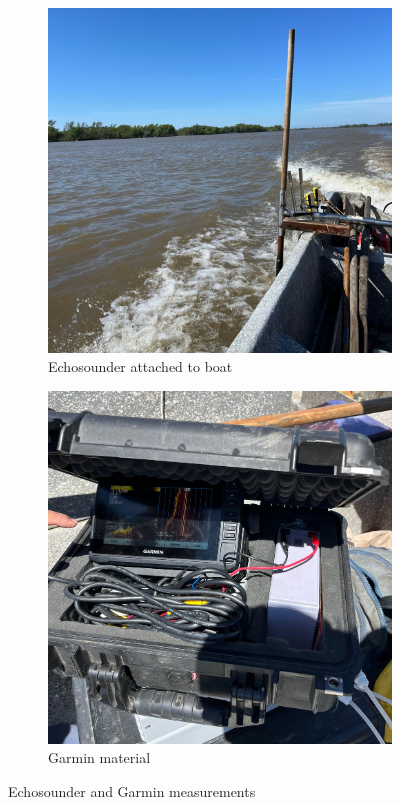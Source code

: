 \begin{figure}[H]
    \centering
    \begin{subfigure}[b]{0.48\textwidth}
        \includegraphics[width=\linewidth]{figures/ch4/Echosounder.jpg}
        \caption{Echosounder attached to boat}
        
    \end{subfigure}
    \hfill
    \begin{subfigure}[b]{0.48\textwidth}
        \includegraphics[width=\linewidth]{figures/ch4/garmin.jpg}
        \caption{Garmin material}
        
    \end{subfigure}
    \caption{Echosounder and Garmin measurements}
    \label{fig:Garmin}
\end{figure}




